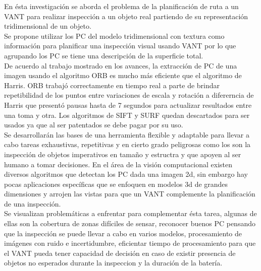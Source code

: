 \documentclass[]{report}
\begin{document}
En ésta investigación se aborda el problema de la planificación de ruta a un VANT para realizar inspección a un objeto real partiendo de su representación tridimensional de un objeto.\\ Se propone utilizar los PC del modelo tridimensional con textura como información para planificar una inspección visual usando VANT por lo que agrupando los PC se tiene una descripción de la superficie total.\\
De acuerdo al trabajo mostrado en los avances, la extracción de PC de una imagen usando el algoritmo ORB es mucho más eficiente que el algoritmo de Harris. ORB trabajó correctamente en tiempo real a parte de brindar repetibilidad de los puntos entre variaciones de escala y rotación a difererncia de Harris que presentó pausas hasta de 7 segundos para actualizar resultados entre una toma y otra. Los algoritmos de SIFT y SURF quedan descartados para ser usados ya que al ser patentados se debe pagar por su uso.\\
Se desarrollarán las bases de una herramienta flexible y adaptable para llevar a cabo tareas exhaustivas, repetitivas y en cierto grado peligrosas como los son la inspección de objetos imperativos en tamaño y estructra y que apoyen al ser humano a tomar decisiones. En el área de la visión computacional existen diversos algoritmos que detectan los PC dada una imagen 2d, sin embargo hay pocas aplicaciones específicas que se enfoquen en modelos 3d de grandes dimensiones y arrojen las vistas para que un VANT complemente la planificación de una inspección.\\ Se visualizan problemáticas a enfrentar para complementar ésta tarea, algunas de ellas son la cobertura de zonas difíciles de sensar, reconocer buenos PC pensando que la inspección se puede llevar a cabo en varios modelos, procesamiento de imágenes con ruido e incertidumbre, eficientar tiempo de procesamiento para que el VANT pueda tener capacidad de decisión en caso de existir presencia de objetos no esperados durante la inspeccion y la duración de la batería.



\end{document}
